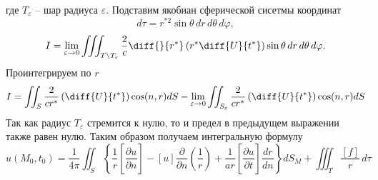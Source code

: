 где $T_\varepsilon$ -- шар радиуса $\varepsilon$. Подставим якобиан сферической сисетмы координат
\begin{equation}
	d\tau = r^{*2} \sin \theta\, dr\,d\theta \, d\varphi,
\end{equation}
\begin{equation}
	I = \lim\limits_{\varepsilon\to 0} \iiint_{T \setminus T_\varepsilon} \frac{2}{c} \diff{}{r^*} \left(r^*\diff{U}{t^*}\right) \sin \theta\, dr\,d\theta \, d\varphi.
\end{equation}
Проинтегрируем по $r$
\begin{equation}
	I =  \iint_{S} \frac{2}{cr^*} \left(\diff{U}{t^*}\right) \cos(n,r) dS - \lim\limits_{\varepsilon\to 0} \iint_{S_\varepsilon} \frac{2}{cr^*} \left(\diff{U}{t^*}\right) \cos(n,r) dS
\end{equation}
Так как радиус $T_\varepsilon$ стремится к нулю, то и предел в предыдущем выражении также равен нулю.
Таким образом получаем интегральную формулу 
\begin{equation}
	u\left(M_{0},t_{0}\right)=\frac{1}{4\pi}\iint_{S}^{}\left\{\frac{1}{r}\left[\frac{\partial u}{\partial n}\right]-\left[u\right]\frac{\partial}{\partial n}\left(\frac{1}{r}\right)+\frac{1}{a r}\left[\frac{\partial u}{\partial t}\right]\frac{d r}{d n}\right\}d S_{M}+\iiint_T\frac{[f]}{r}\,d\tau
	\label{eq:kirsam}
\end{equation}

